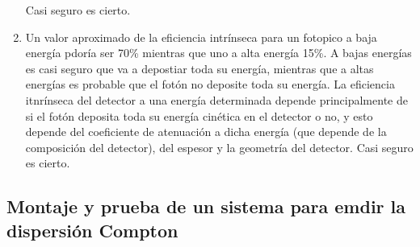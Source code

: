 \documentclass[11pt]{article}
\begin{document}
\begin{enumerate}[label=\alph*)]
    \textcolor{BrickRed}{Casi seguro es cierto.}
    \item Un valor aproximado de la eficiencia intrínseca para un fotopico a baja energía pdoría ser 70\% mientras que uno a alta energía 15\%. A bajas energías es casi seguro que va a depostiar toda su energía, mientras que a altas energías es probable que el fotón no deposite toda su energía. La eficiencia itnrínseca del detector a una energía determinada depende principalmente de si el fotón deposita toda su energía cinética en el detector o no, y esto depende del coeficiente de atenuación a dicha energía (que depende de la composición del detector),  del espesor y la geometría del detector. \textcolor{BrickRed}{Casi seguro es cierto.}
\end{enumerate}


\subsection{Montaje y prueba de un sistema para emdir la dispersión Compton}
\end{document}
